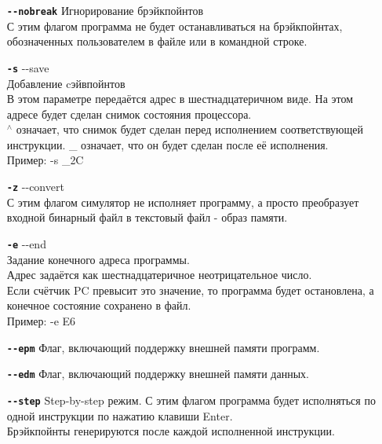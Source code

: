 \begin{enumerate}
	\item[{\tt\bf {-}-nobreak}]
	Игнорирование брэйкпойнтов \\
	С этим флагом программа не будет останавливаться на брэйкпойнтах, обозначенных пользователем в файле или в командной строке.
	
	\item[{\tt\bf -s}] {-}-save \\
	Добавление cэйвпойнтов \\
	В этом параметре передаётся адрес в шестнадцатеричном виде. На этом адресе будет сделан снимок состояния процессора. \\
	$^\wedge$ означает, что снимок будет сделан перед исполнением соответствующей инструкции. \_ означает, что он будет сделан после её исполнения. \\
	Пример: -s {\_}2C
	
	\item[{\tt\bf -z}] {-}-convert \\
	С этим флагом симулятор не исполняет программу, а просто преобразует входной бинарный файл в текстовый файл - образ памяти.\\

	\item[{\tt\bf -e}] {-}-end \\
	Задание конечного адреса программы. \\
	Адрес задаётся как шестнадцатеричное неотрицательное число. \\
	Если счётчик PC превысит это значение, то программа будет остановлена, а конечное состояние сохранено в файл. \\
	Пример: -e E6
	
	\item[{\tt\bf {-}-epm}]
	Флаг, включающий поддержку внешней памяти программ.
	
	\item[{\tt\bf {-}-edm}]
	Флаг, включающий поддержку внешней памяти данных.
	
	\item[{\tt\bf {-}-step}]
	Step-by-step режим. С этим флагом программа будет исполняться по одной инструкции по нажатию клавиши Enter.\\
	Брэйкпойнты генерируются после каждой исполненной инструкции.
	
\end{enumerate}

